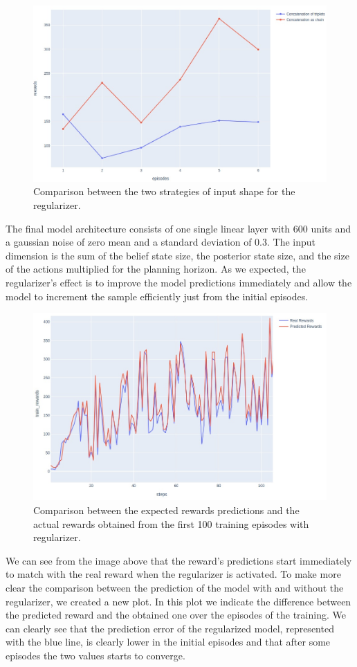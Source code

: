 \begin{figure}[H]
\centering
\includegraphics[width=.90 \textwidth, height=.25\textheight]{pictures/comparison_chain_vs_tripl}
\caption{ Comparison between the two strategies of input shape for the regularizer. }
\end{figure}

The final model architecture consists of one single linear layer with 600 units and a gaussian noise of zero mean and a standard deviation of 0.3.
The input dimension is the sum of the belief state size, the posterior state size, and the size of the actions multiplied for the planning horizon.
As we expected, the regularizer's effect is to improve the model predictions immediately and allow the model to increment the sample efficiently just from the initial episodes.


\begin{figure}[H]
\centering
\includegraphics[width=1. \textwidth, height=.35\textheight]{pictures/reg_pred_vs_real_rew}
\caption{ Comparison between the expected rewards predictions and the actual rewards obtained from the first 100 training episodes with regularizer. }
\end{figure}
We can see from the image above that the reward's predictions start immediately to match with the real reward when the regularizer is activated.  
To make more clear the comparison between the prediction of the model with and without the regularizer, we created a new plot. 
In this plot we indicate the difference between the predicted reward and the obtained one over the episodes of the training. 
We can clearly see that the prediction error of the regularized model, represented with the blue line, is clearly lower in the initial episodes and that after some episodes the two values starts to converge.

